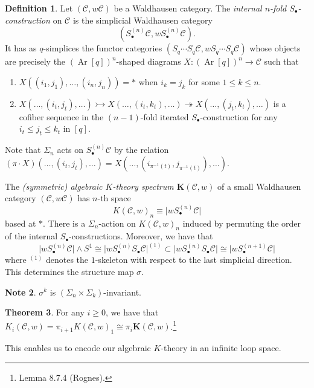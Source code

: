 \documentclass[10pt,letterpaper,cm]{nupset}
\theoremstyle{definition}
\newtheorem{definition}{Definition}[section]
\newtheorem{note}[definition]{Note}
\theoremstyle{theorem}
\newtheorem{theorem}[definition]{Theorem}
\theoremstyle{remark}
\newcommand{\1}{\mathbf{1}}
\renewcommand{\c}{\mathscr{C}}
\newcommand{\0}{\vec 0}
\DeclareMathOperator{\Ar}{Ar}
\begin{document}
\begin{definition}
Let $\left(\c,w{\c}\right)$ be a Waldhausen category. The \textit{internal $n$-fold $S_{\bullet}$-construction} on $\c$ is the simplicial Waldhausen category $$\left(S_{\bullet}^{(n)}\c, wS_{\bullet}^{(n)} \c\right).$$ It has as $q$-simplices the functor categories $\left(S_q \cdots S_q \c, wS_q \cdots S_q \c\right)$ whose objects are precisely the $\left(\Ar[q]\right)^n$-shaped diagrams  $X: \left(\Ar[q]\right)^n\to \c$ such that
\begin{enumerate}[label=(\roman*)]
\item $X((i_1, j_1), \ldots, (i_n, j_n)) = \ast$ when $i_k = j_k$ for some $1\leq k \leq n$.
\item $X(\ldots, (i_t, j_t), \ldots) \rightarrowtail X(\ldots, (i_t, k_t), \ldots) \twoheadrightarrow X(\ldots, (j_t, k_t), \ldots)$ is a cofiber sequence  in the $(n-1)$-fold iterated $S_{\bullet}$-construction for any $i_t \leq j_t \leq k_t$ in $[q]$.
\end{enumerate}
Note that $\Sigma_n$ acts on $S_{\bullet}^{(n)}\c$ by the relation $(\pi \cdot X)(\ldots, (i_t, j_t), \ldots) = X(\ldots, (i_{\pi^{{-1}}(t)}, j_{\pi^{{-1}}(t)}), \ldots)$.
\end{definition}

\medskip


The \textit{(symmetric) algebraic $K$-theory  spectrum $\mathbf{K}(\c, w)$} of a small Waldhausen category $\left(\c,w{\c}\right)$ has $n$-th space $$K(\c, w)_n \equiv \lvert{wS_{\bullet}^{(n)}\c}\rvert$$ based at $\ast$. There is a $\Sigma_n$-action on $K(\c, w)_n$ induced by permuting the order of the internal $S_{\bullet}$-constructions. Moreover, we have that $$\lvert{wS_{\bullet}^{(n)}\c}\rvert \land S^1 \cong \lvert{wS_{\bullet}^{(n)}S_{\bullet}\c}\rvert^{(1)} \subset \lvert{wS_{\bullet}^{(n)}S_{\bullet}\c}\rvert \cong \lvert{wS_{\bullet}^{(n+1)}\c}\rvert$$ where $^{(1)}$ denotes the $1$-skeleton with respect to the last simplicial direction. This determines the structure map $\sigma$.

\begin{note}
$\sigma^k$ is $\left(\Sigma_{n} \times \Sigma_{k}\right)$-invariant.
\end{note}



\begin{theorem}\label{lt}
For any $i\geq 0$, we have that $K_i(\c, w) = \pi_{i+1}K(\c, w)_1 \cong \pi_i \mathbf{K}(\c, w)$.\footnote{Lemma 8.7.4 (Rognes).}
\end{theorem}



This enables us to encode our algebraic $K$-theory in an infinite loop space.
\end{document}
